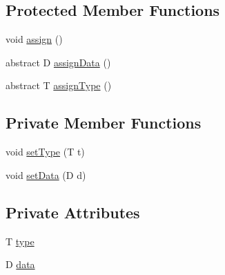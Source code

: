 \subsection*{Protected Member Functions}
\begin{DoxyCompactItemize}
\item 
void \hyperlink{classit_1_1emarolab_1_1cagg_1_1core_1_1language_1_1SyntaxBinaryNode_3_01T_01extends_01Enum_3_04_6f6f52bca8b05a51e94968cedaccd1f1_ac297470a0ead4cefc3669eaf3c1f03cf}{assign} ()
\item 
abstract D \hyperlink{classit_1_1emarolab_1_1cagg_1_1core_1_1language_1_1SyntaxBinaryNode_3_01T_01extends_01Enum_3_04_6f6f52bca8b05a51e94968cedaccd1f1_a07adb09278d0c85721a6ada656a6e722}{assign\-Data} ()
\item 
abstract T \hyperlink{classit_1_1emarolab_1_1cagg_1_1core_1_1language_1_1SyntaxBinaryNode_3_01T_01extends_01Enum_3_04_6f6f52bca8b05a51e94968cedaccd1f1_ab1bd99bb7831f331927c3f675a6ebb40}{assign\-Type} ()
\end{DoxyCompactItemize}
\subsection*{Private Member Functions}
\begin{DoxyCompactItemize}
\item 
void \hyperlink{classit_1_1emarolab_1_1cagg_1_1core_1_1language_1_1SyntaxBinaryNode_3_01T_01extends_01Enum_3_04_6f6f52bca8b05a51e94968cedaccd1f1_a7be3d1de8df4ce6f6cd6a57a4f35218f}{set\-Type} (T t)
\item 
void \hyperlink{classit_1_1emarolab_1_1cagg_1_1core_1_1language_1_1SyntaxBinaryNode_3_01T_01extends_01Enum_3_04_6f6f52bca8b05a51e94968cedaccd1f1_aa05c306a92774e4a653966efa3171258}{set\-Data} (D d)
\end{DoxyCompactItemize}
\subsection*{Private Attributes}
\begin{DoxyCompactItemize}
\item 
T \hyperlink{classit_1_1emarolab_1_1cagg_1_1core_1_1language_1_1SyntaxBinaryNode_3_01T_01extends_01Enum_3_04_6f6f52bca8b05a51e94968cedaccd1f1_a4426abc1ae2240232658485eab6a9e5a}{type}
\item 
D \hyperlink{classit_1_1emarolab_1_1cagg_1_1core_1_1language_1_1SyntaxBinaryNode_3_01T_01extends_01Enum_3_04_6f6f52bca8b05a51e94968cedaccd1f1_aba625b314880e275f09984235373f5ef}{data}
\end{DoxyCompactItemize}


